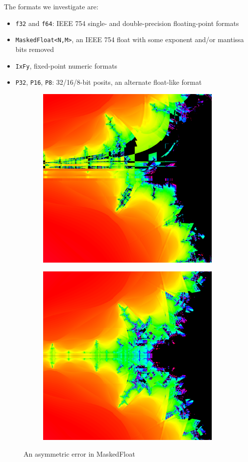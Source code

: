 \documentclass[sigconf,authorversion,nonacm]{acmart}
\begin{document}
The formats we investigate are:

\begin{itemize}
  \item  \texttt{f32} and \texttt{f64}: IEEE 754 single- and double-precision floating-point formats\cite{cowlishaw2008standard}
  \item  \texttt{MaskedFloat<N,M>}, an IEEE 754 float with some exponent and/or mantissa bits removed
  \item  \texttt{IxFy}, fixed-point numeric formats \cite{fixedp, rust:fixed}
  \item  \texttt{P32}, \texttt{P16}, \texttt{P8}: 32/16/8-bit posits\texttrademark, an alternate float-like format\cite{posit}
\end{itemize}

\begin{figure}
    \begin{subfigure}[bug]
        \centering
        \includegraphics[width=0.48\linewidth]{images/0-mfbug/mf3-bugged.png}
    \end{subfigure}
    \quad
    \begin{subfigure}[no bug]
        \centering
        \includegraphics[width=0.48\linewidth]{images/0-mfbug/mf3-nobug.png}
    \end{subfigure}
    \caption{An asymmetric error in MaskedFloat}
    \label{fig:0-mfbug}
\end{figure}
\end{document}
